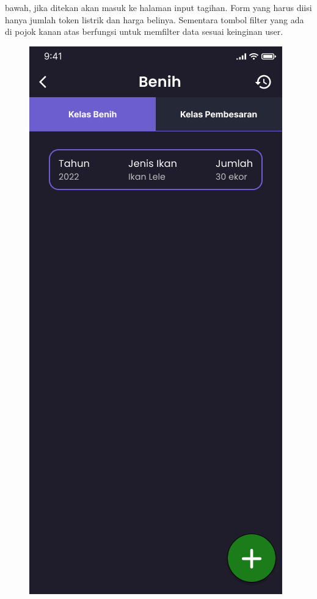 \begin{spacing}{1.5}
 bawah, jika ditekan akan masuk ke halaman input tagihan. Form yang harus diisi hanya jumlah token listrik dan harga belinya. Sementara tombol filter yang ada di pojok kanan atas berfungsi untuk memfilter data sesuai keinginan user.

	\begin{figure}[H]
			\includegraphics[width=\linewidth]{gambar/sprint1/mockup_detail_seed.png}

\end{figure}
\end{spacing}
